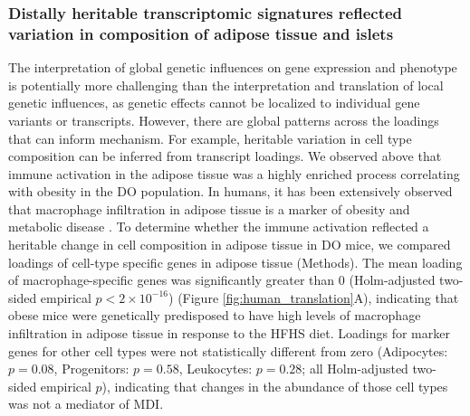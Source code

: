 \documentclass[
]{article}
\begin{document}
\subsubsection{Distally heritable transcriptomic signatures reflected
variation in composition of adipose tissue and
islets}\label{distally-heritable-transcriptomic-signatures-reflected-variation-in-composition-of-adipose-tissue-and-islets}

The interpretation of global genetic influences on gene expression and
phenotype is potentially more challenging than the interpretation and
translation of local genetic influences, as genetic effects cannot be
localized to individual gene variants or transcripts. However, there are
global patterns across the loadings that can inform mechanism. For
example, heritable variation in cell type composition can be inferred
from transcript loadings. We observed above that immune activation in
the adipose tissue was a highly enriched process correlating with
obesity in the DO population. In humans, it has been extensively
observed that macrophage infiltration in adipose tissue is a marker of
obesity and metabolic disease \cite{pmid24781408}. To determine whether
the immune activation reflected a heritable change in cell composition
in adipose tissue in DO mice, we compared loadings of cell-type specific
genes in adipose tissue (Methods). The mean loading of
macrophage-specific genes was significantly greater than 0
(Holm-adjusted two-sided empirical \(p < 2\times10^{-16}\)) (Figure
\ref{fig:human_translation}A), indicating that obese mice were
genetically predisposed to have high levels of macrophage infiltration
in adipose tissue in response to the HFHS diet. Loadings for marker
genes for other cell types were not statistically different from zero
(Adipocytes: \(p = 0.08\), Progenitors: \(p = 0.58\), Leukocytes:
\(p = 0.28\); all Holm-adjusted two-sided empirical \(p\)), indicating
that changes in the abundance of those cell types was not a mediator of
MDI.
\end{document}
